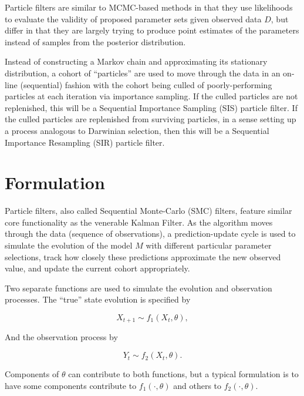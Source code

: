 

	Particle filters are similar to MCMC-based methods in that they use likelihoods to evaluate the validity of proposed parameter sets given observed data $D$, but differ in that they are largely trying to produce point estimates of the parameters instead of samples from the posterior distribution.

	Instead of constructing a Markov chain and approximating its stationary distribution, a cohort of ``particles'' are used to move through the data in an on-line (sequential) fashion with the cohort being culled of poorly-performing particles at each iteration via importance sampling. If the culled particles are not replenished, this will be a Sequential Importance Sampling (SIS) particle filter. If the culled particles are replenished from surviving particles, in a sense setting up a process analogous to Darwinian selection, then this will be a Sequential Importance Resampling (SIR) particle filter.


\section{Formulation}

	Particle filters, also called Sequential Monte-Carlo (SMC) filters, feature similar core functionality as the venerable Kalman Filter. As the algorithm moves through the data (sequence of observations), a prediction-update cycle is used to simulate the evolution of the model $M$ with different particular parameter selections, track how closely these predictions approximate the new observed value, and update the current cohort appropriately.

	Two separate functions are used to simulate the evolution and observation processes. The ``true'' state evolution is specified by

	\begin{equation}
		X_{t+1} \sim f_1 (X_t, \theta),
	\end{equation}

	And the observation process by

	\begin{equation}
		Y_t \sim f_2 (X_t, \theta).
	\end{equation}

	Components of $\theta$ can contribute to both functions, but a typical formulation is to have some components contribute to $f_1 (\cdot, \theta)$ and others to $f_2 (\cdot,\theta)$.

